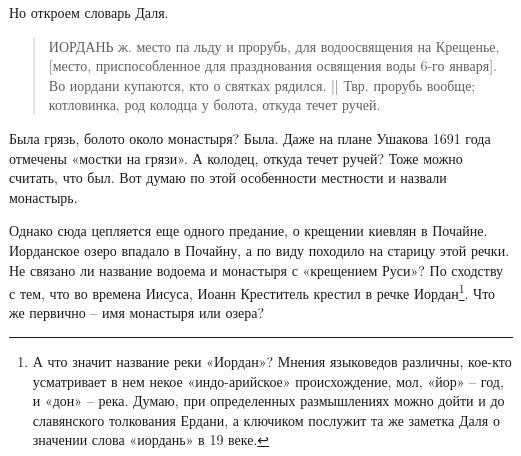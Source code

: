 Но откроем словарь Даля.

\begin{quotation}
ИОРДАНЬ ж. место па льду и прорубь, для водоосвящения на Крещенье, [место, приспособленное для празднования освящения воды 6-го января]. Во иордани купаются, кто о святках  рядился. || Твр. прорубь вообще; котловинка, род колодца у болота, откуда течет ручей.
\end{quotation}

Была грязь, болото около монастыря? Была. Даже на плане Ушакова 1691 года отмечены «мостки на грязи». А колодец, откуда течет ручей? Тоже можно считать, что был. Вот думаю по этой особенности местности и назвали монастырь.

Однако сюда цепляется еще одного предание, о крещении киевлян в Почайне. Иорданское озеро впадало в Почайну, а по виду походило на старицу этой речки. Не связано ли название водоема и монастыря с «крещением Руси»? По сходству с тем, что во времена Иисуса, Иоанн Креститель крестил в речке Иордан\footnote{А что значит название реки «Иордан»? Мнения языковедов различны, кое-кто усматривает в нем некое «индо-арийское» происхождение, мол, «йор» – год, и «дон» – река. Думаю, при определенных размышлениях можно дойти и до славянского толкования Ердани, а ключиком послужит та же заметка Даля о значении слова «иордань» в 19 веке.}. Что же первично – имя монастыря или озера?
